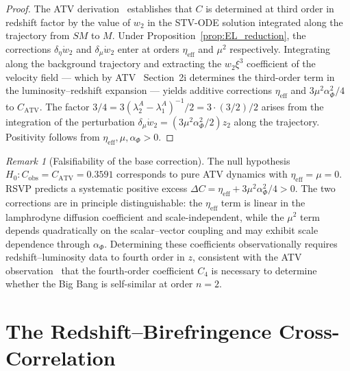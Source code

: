 \documentclass[12pt,a4paper]{article}
\theoremstyle{plain}
\theoremstyle{definition}
\theoremstyle{remark}
\newtheorem{remark}[theorem]{Remark}
\newcommand{\SM}{\mathit{SM}}
\newcommand{\Mink}{\mathit{M}}
\newcommand{\etaeff}{\eta_{\mathrm{eff}}}
\newcommand{\lAn}[1]{\lambda^A_{#1}}
\begin{document}
\begin{proof}
The ATV derivation~\cite{STV2017,ATV2026} establishes that $C$ is determined at
third order in redshift factor by the value of $w_2$ in the STV-ODE solution
integrated along the trajectory from $\SM$ to $\Mink$. Under
Proposition~\ref{prop:EL_reduction}, the corrections $\delta_\eta\dot{w}_2$
and $\delta_\mu\dot{w}_2$ enter at orders $\etaeff$ and $\mu^2$ respectively.
Integrating along the background trajectory and extracting the $w_2\xi^3$ coefficient
of the velocity field --- which by ATV~\cite{ATV2026} Section~2i determines
the third-order term in the luminosity--redshift expansion --- yields additive
corrections $\etaeff$ and $3\mu^2\alpha_\Phi^2/4$ to $C_{\mathrm{ATV}}$.
The factor $3/4 = 3(\lAn{2}-\lAn{1})^{-1}/2 = 3\cdot(3/2)/2$ arises from the
integration of the perturbation $\delta_\mu\dot{w}_2 = (3\mu^2\alpha_\Phi^2/2)z_2$
along the trajectory. Positivity follows from $\etaeff,\mu,\alpha_\Phi > 0$.
\end{proof}

\begin{remark}[Falsifiability of the base correction]
The null hypothesis $H_0: C_{\mathrm{obs}} = C_{\mathrm{ATV}} = 0.3591$ corresponds
to pure ATV dynamics with $\etaeff = \mu = 0$. RSVP predicts a systematic positive
excess $\Delta C = \etaeff + 3\mu^2\alpha_\Phi^2/4 > 0$. The two corrections are
in principle distinguishable: the $\etaeff$ term is linear in the lamphrodyne
diffusion coefficient and scale-independent, while the $\mu^2$ term depends
quadratically on the scalar--vector coupling and may exhibit scale dependence
through $\alpha_\Phi$. Determining these coefficients observationally requires
redshift--luminosity data to fourth order in $z$, consistent with the ATV
observation~\cite{ATV2026} that the fourth-order coefficient $C_4$ is necessary
to determine whether the Big Bang is self-similar at order $n=2$.
\end{remark}

\section{The Redshift--Birefringence Cross-Correlation}
\label{sec:bire}
\end{document}
